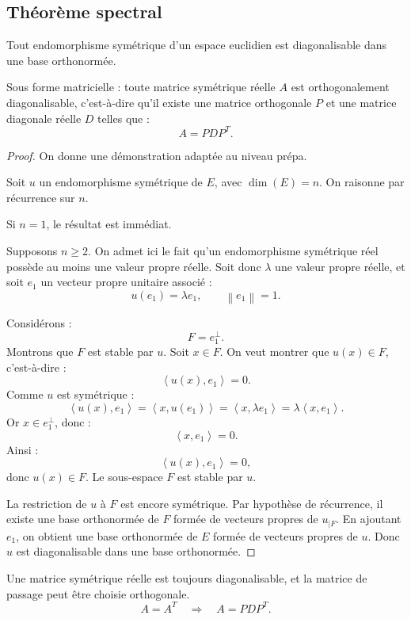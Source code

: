 \documentclass[11pt,a4paper]{article}
\newcommand{\norme}[1]{\left\lVert #1\right\rVert}
\newcommand{\scal}[2]{\left\langle #1,#2\right\rangle}
\begin{document}
\subsection{Théorème spectral}

\begin{theorembox}
Tout endomorphisme symétrique d'un espace euclidien est diagonalisable dans une base orthonormée.

Sous forme matricielle : toute matrice symétrique réelle \(A\) est orthogonalement diagonalisable, c'est-à-dire qu'il existe une matrice orthogonale \(P\) et une matrice diagonale réelle \(D\) telles que :
\[
A=PDP^T.
\]
\end{theorembox}

\begin{proof}
On donne une démonstration adaptée au niveau prépa.

Soit \(u\) un endomorphisme symétrique de \(E\), avec \(\dim(E)=n\).  
On raisonne par récurrence sur \(n\).

Si \(n=1\), le résultat est immédiat.

Supposons \(n\geq2\).  
On admet ici le fait qu'un endomorphisme symétrique réel possède au moins une valeur propre réelle.  
Soit donc \(\lambda\) une valeur propre réelle, et soit \(e_1\) un vecteur propre unitaire associé :
\[
u(e_1)=\lambda e_1,
\qquad
\norme{e_1}=1.
\]

Considérons :
\[
F=e_1^\perp.
\]
Montrons que \(F\) est stable par \(u\).  
Soit \(x\in F\).  
On veut montrer que \(u(x)\in F\), c'est-à-dire :
\[
\scal{u(x)}{e_1}=0.
\]
Comme \(u\) est symétrique :
\[
\scal{u(x)}{e_1}
=
\scal{x}{u(e_1)}
=
\scal{x}{\lambda e_1}
=
\lambda\scal{x}{e_1}.
\]
Or \(x\in e_1^\perp\), donc :
\[
\scal{x}{e_1}=0.
\]
Ainsi :
\[
\scal{u(x)}{e_1}=0,
\]
donc \(u(x)\in F\).  
Le sous-espace \(F\) est stable par \(u\).

La restriction de \(u\) à \(F\) est encore symétrique.  
Par hypothèse de récurrence, il existe une base orthonormée de \(F\) formée de vecteurs propres de \(u_{\mid F}\).  
En ajoutant \(e_1\), on obtient une base orthonormée de \(E\) formée de vecteurs propres de \(u\).  
Donc \(u\) est diagonalisable dans une base orthonormée.
\end{proof}

\begin{retenirbox}
Une matrice symétrique réelle est toujours diagonalisable, et la matrice de passage peut être choisie orthogonale.
\[
A=A^T
\quad\Longrightarrow\quad
A=PDP^T.
\]
\end{retenirbox}
\end{document}
